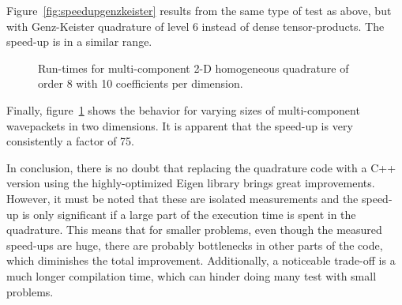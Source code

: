 Figure~\ref{fig:speedupgenzkeister} results from the same type of test as above,
but with Genz-Keister quadrature of level 6 instead of dense tensor-products.
The speed-up is in a similar range.

\begin{figure}
  \center
  
  \caption{Run-times for multi-component 2-D homogeneous quadrature of order 8
    with 10 coefficients per dimension.}
  \label{fig:speedupncomps}
\end{figure}

Finally, figure~\ref{fig:speedupncomps} shows the behavior for varying sizes
of multi-component wavepackets in two dimensions.
It is apparent that the speed-up is very consistently a factor of 75.

In conclusion, there is no doubt that replacing the quadrature code with a C++
version using the highly-optimized Eigen library brings great improvements.
However, it must be noted that these are isolated measurements and the speed-up
is only significant if a large part of the execution time is spent in the
quadrature.
This means that for smaller problems, even though the measured speed-ups are
huge, there are probably bottlenecks in other parts of the code, which
diminishes the total improvement.
Additionally, a noticeable trade-off is a much longer compilation time, which
can hinder doing many test with small problems.
